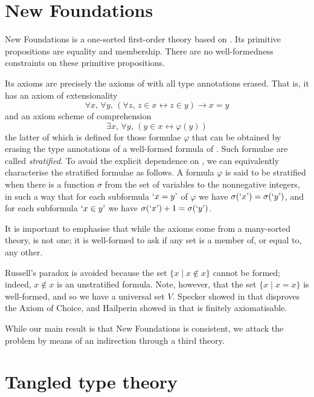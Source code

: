 \section{New Foundations}

New Foundations is a one-sorted first-order theory based on {\TST}.
Its primitive propositions are equality and membership.
There are no well-formedness constraints on these primitive propositions.

Its axioms are precisely the axioms of {\TST} with all type annotations erased.
That is, it has an axiom of extensionality
\[ \forall x,\, \forall y,\, (\forall z,\, z \in x \leftrightarrow z \in y) \to x = y \]
and an axiom scheme of comprehension
\[ \exists x,\, \forall y,\, (y \in x \leftrightarrow \varphi(y)) \]
the latter of which is defined for those formulae \( \varphi \) that can be obtained by erasing the type annotations of a well-formed formula of {\TST}.
Such formulae are called \emph{stratified}.
To avoid the explicit dependence on {\TST}, we can equivalently characterise the stratified formulae as follows.
A formula \( \varphi \) is said to be stratified when there is a function \( \sigma \) from the set of variables to the nonnegative integers, in such a way that for each subformula \( \mquote{x = y} \) of \( \varphi \) we have \( \sigma(\mquote{x}) = \sigma(\mquote{y}) \), and for each subformula \( \mquote{x \in y} \) we have \( \sigma(\mquote{x}) + 1 = \sigma(\mquote{y}) \).

It is important to emphasise that while the axioms come from a many-sorted theory, {\NF} is not one; it is well-formed to ask if any set is a member of, or equal to, any other.

Russell's paradox is avoided because the set \( \{ x \mid x \notin x \} \) cannot be formed; indeed, \( x \notin x \) is an unstratified formula.
Note, however, that the set \( \{ x \mid x = x \} \) is well-formed, and so we have a universal set \( V \).
Specker showed in \cite{specker-choice-nf} that {\NF} disproves the Axiom of Choice, and Hailperin showed in \cite{hailperin-finite-axiomatisation} that {\NF} is finitely axiomatisable.

While our main result is that New Foundations is consistent, we attack the problem by means of an indirection through a third theory.

\section{Tangled type theory}
\label{ss:theories:ttt}

